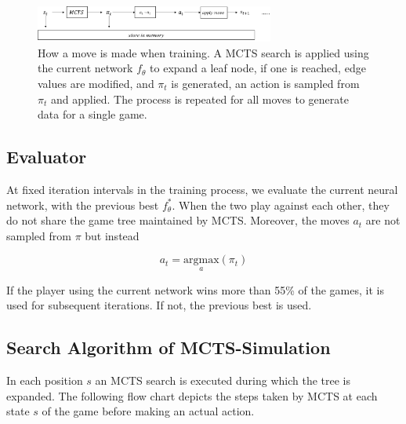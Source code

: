 \documentclass[english]{article}
\begin{document}
\begin{figure}[h]
\centering
\includegraphics[width=0.7\textwidth]{./images/self_play}
\caption{How a move is made when training. A MCTS search is applied using the
    current network $f_{\theta}$ to expand a leaf node, if one is reached, edge
    values are modified, and $\pi_t$ is generated, an action is sampled from
    $\pi_t$ and applied. The process is repeated for all moves to generate data
    for a single game.}
\label{fig:figure_self_play}
\end{figure}

\subsection{Evaluator}
At fixed iteration intervals in the training process, we evaluate the current
neural network, with the previous best $f_{\theta}^{\ast}$. When the two play
against each other, they do not share the game tree maintained by MCTS.
Moreover, the moves $a_t$ are not sampled from $\pi$ but instead

\begin{equation}
    a_t=\underset{a}{\text{argmax}} (\pi_t)
\end{equation}

If the player using the current network wins more than 55\% of the games, it is
used for subsequent iterations. If not, the previous best is used.




\subsection{Search Algorithm of MCTS-Simulation}

In each position $s$ an MCTS search is executed during which the
tree is expanded. The following flow chart depicts the steps taken
by MCTS at each state $s$ of the game before making an actual action.
\end{document}
